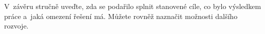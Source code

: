 

V~závěru stručně uveďte, zda se podařilo splnit stanovené cíle,
co bylo výsledkem práce a~jaká omezení řešení má. Můžete rovněž naznačit
možnosti dalšího rozvoje.

